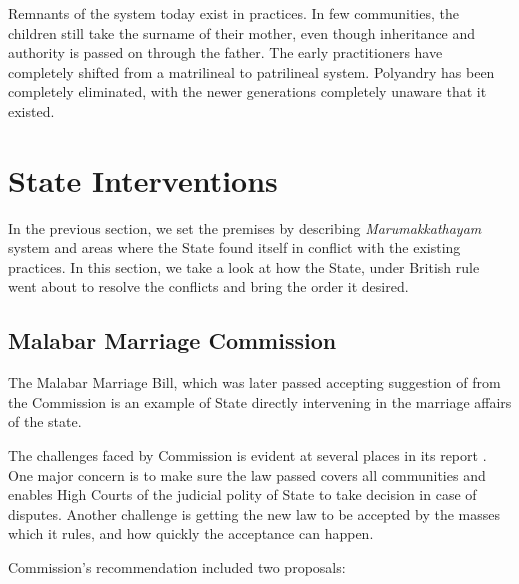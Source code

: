 \documentclass[a4paper]{article}
\begin{document}
Remnants of the system today exist in practices.
In few communities, the children still take the
surname of their mother, even though inheritance
and authority is passed on through the father. The
early practitioners have completely shifted from a
matrilineal to patrilineal system. Polyandry has
been completely eliminated, with the newer
generations completely unaware that it existed. 

\section{State Interventions}
In the previous section, we set the premises by
describing \emph{Marumakkathayam} system and areas
where the State found itself in conflict with the
existing practices. In this section, we take a
look at how the State, under British rule
went about to resolve the conflicts and bring the
order it desired.

\subsection{Malabar Marriage Commission}
The Malabar Marriage Bill, which was later passed
accepting suggestion of from the Commission is an
example of State directly intervening in the
marriage affairs of the state.  

The challenges faced by Commission is evident at
several places in its report
\cite{menon1894report}. One major concern is to
make sure the law passed covers all communities
and enables High Courts of the judicial polity of
State to take decision in case of disputes.
Another challenge is getting the new law to be
accepted by the masses which it rules, and how
quickly the acceptance can happen. 

Commission's recommendation included two
proposals:
\end{document}
